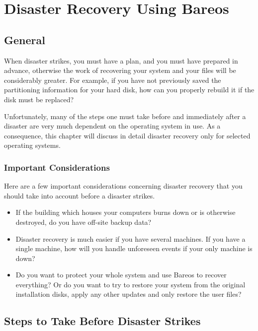 
\chapter{Disaster Recovery Using Bareos}
\label{RescueChapter}

\section{General}

When disaster strikes, you must have a plan, and you must have prepared in
advance, otherwise the work of recovering your system and your files will be
considerably greater.  For example, if you have not previously saved the
partitioning information for your hard disk, how can you properly rebuild
it if the disk must be replaced?

Unfortunately, many of the steps one must take before and immediately after
a disaster are very much dependent on the operating system in use.  As a
consequence, this chapter will discuss in detail disaster recovery only for selected operating systems.

\subsection{Important Considerations}

Here are a few important considerations concerning disaster recovery that
you should take into account before a disaster strikes.

\begin{itemize}
\item If the building which houses your computers burns down or is otherwise
   destroyed, do you have off-site backup data?
\item Disaster recovery is much easier if you have several machines. If  you
   have a single machine, how will you handle unforeseen events  if your only
   machine is down?
\item Do you want to protect your whole system and use Bareos to  recover
   everything? Or do you want to try to restore your system from  the original
   installation disks, apply any other updates and only restore the user files?
\end{itemize}

\section{Steps to Take Before Disaster Strikes}
\label{sec:before-disaster}

